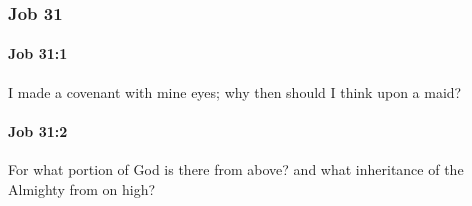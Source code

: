 	\subsubsection{Job 31} %
		\label{JOB-31}

		\paragraph{Job 31:1} %
			\label{JOB-31-1}

			I made a covenant with mine eyes; why then should I think upon a maid?


		\paragraph{Job 31:2} %
			\label{JOB-31-2}

			For what portion of God is there from above? and what inheritance of the Almighty from on high?

